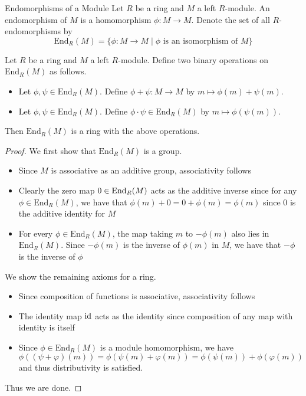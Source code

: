 \documentclass[a4paper]{article}
\begin{document}
\begin{defn}{Endomorphisms of a Module}{} Let $R$ be a ring and $M$ a left $R$-module. An endomorphism of $M$ is a homomorphism $\phi:M\to M$. Denote the set of all $R$-endomorphisms by $$\text{End}_R(M)=\{\phi:M\to M\;|\;\phi\text{ is an isomorphism of }M\}$$
\end{defn}

\begin{prp}{}{} Let $R$ be a ring and $M$ a left $R$-module. Define two binary operations on $\text{End}_R(M)$ as follows. 
\begin{itemize}
\item Let $\phi,\psi\in\text{End}_R(M)$. Define $\phi+\psi:M\to M$ by $m\mapsto\phi(m)+\psi(m)$. 
\item Let $\phi,\psi\in\text{End}_R(M)$. Define $\phi\cdot\psi\in\text{End}_R(M)$ by $m\mapsto\phi(\psi(m))$. 
\end{itemize}
Then $\text{End}_R(M)$ is a ring with the above operations. \tcbline
\begin{proof}
We first show that $\text{End}_R(M)$ is a group. 
\begin{itemize}
\item Since $M$ is associative as an additive group, associativity follows
\item Clearly the zero map $0\in\operatorname{End}_R(M)$ acts as the additive inverse since for any $\phi\in\text{End}_R(M)$, we have that $\phi(m)+0=0+\phi(m)=\phi(m)$ since $0$ is the additive identity for $M$
\item For every $\phi\in\text{End}_R(M)$, the map taking $m$ to $-\phi(m)$ also lies in $\text{End}_R(M)$. Since $-\phi(m)$ is the inverse of $\phi(m)$ in $M$, we have that $-\phi$ is the inverse of $\phi$
\end{itemize}
We show the remaining axioms for a ring. 
\begin{itemize}
\item Since composition of functions is associative, associativity follows
\item The identity map $\operatorname{id}$ acts as the identity since composition of any map with identity is itself
\item Since $\phi\in\text{End}_R(M)$ is a module homomorphism, we have $$\phi((\psi+\varphi)(m))=\phi(\psi(m)+\varphi(m))=\phi(\psi(m))+\phi(\varphi(m))$$ and thus distributivity is satisfied. 
\end{itemize}
Thus we are done. 
\end{proof}
\end{prp}
\end{document}
